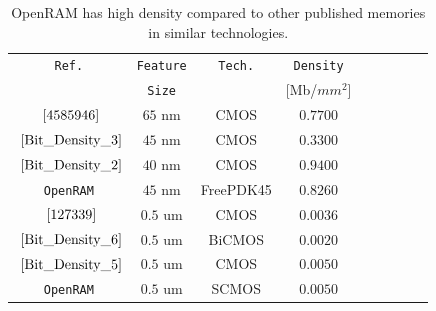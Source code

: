 \begin{table}[t]
\centering
\caption{OpenRAM has high density compared to other published memories in
  similar technologies.}
\begin{tabular}{|c|c|c|c|l|l|l|l|l|} \hline
\texttt{Ref.} & \texttt{Feature} & \texttt{Tech.} & \texttt{Density} \\
                   & \texttt{Size}    &               & [Mb/$mm^2$] \\
\hline \hline
$~\cite{4585946}$       & $65$ nm  & CMOS      & $0.7700$ \\ \hline
$~\cite{Bit_Density_3}$ & $45$ nm  & CMOS      & $0.3300$ \\ \hline
$~\cite{Bit_Density_2}$ & $40$ nm  & CMOS      & $0.9400$ \\ \hline
\verb+OpenRAM+          & $45$ nm  & FreePDK45 & $0.8260$ \\ \hline \hline
$~\cite{127339}$        & $0.5$ um & CMOS      & $0.0036$ \\ \hline
$~\cite{Bit_Density_6}$ & $0.5$ um & BiCMOS    & $0.0020$ \\ \hline
$~\cite{Bit_Density_5}$ & $0.5$ um & CMOS      & $0.0050$ \\ \hline
\verb+OpenRAM+          & $0.5$ um & SCMOS     & $0.0050$ \\ \hline
\end{tabular}
\label{table:bit-density-comparison}
\end{table}


